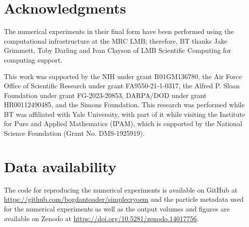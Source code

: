 \documentclass{article}
\begin{document}
\newpage

\section{Acknowledgments}

The numerical experiments in their final form have been performed using the computational infrastructure at the MRC LMB; therefore, BT thanks Jake Grimmett, Toby Darling and Ivan Clayson of LMB Scientific Computing for computing support.

This work was supported by the NIH under grant R01GM136780, the Air Force Office of Scientific Research under grant FA9550-21-1-0317, the Alfred P. Sloan Foundation under grant FG-2023-20853, DARPA/DOD under grant HR00112490485, and the Simons Foundation. 
This research was performed while BT was affiliated with Yale University, with part of it while visiting the Institute for Pure and Applied Mathematics (IPAM), which is supported by the National Science Foundation (Grant No. DMS-1925919).



\section{Data availability}

The code for reproducing the numerical experiments is available on GitHub at\newline
\url{https://github.com/bogdantoader/simplecryoem} and the particle metadata used for the numerical experiments as well as the output volumes and figures are available on Zenodo at\newline
\url{https://doi.org/10.5281/zenodo.14017756}.


\printbibliography
\end{document}
